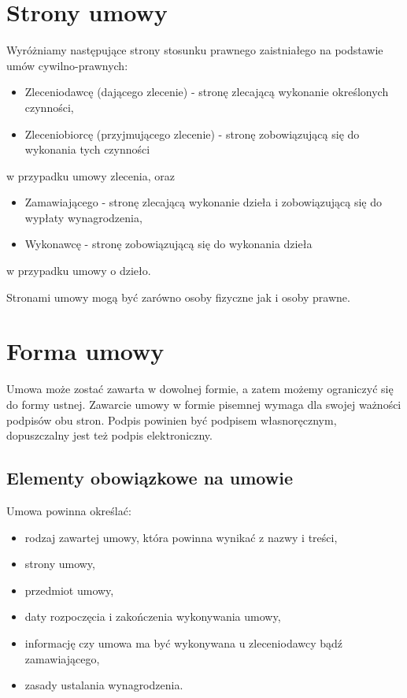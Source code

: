\section[Strony umowy][Strony umowy]{Strony umowy}
Wyróżniamy następujące strony stosunku prawnego zaistniałego na podstawie umów cywilno-prawnych:
\begin{itemize}
	\item Zleceniodawcę (dającego zlecenie) - stronę zlecającą wykonanie określonych czynności,
	\item Zleceniobiorcę (przyjmującego zlecenie) - stronę zobowiązującą się do wykonania tych czynności
\end{itemize}
w przypadku umowy zlecenia, oraz
\begin{itemize}
	\item Zamawiającego - stronę zlecającą wykonanie dzieła i zobowiązującą się do wypłaty wynagrodzenia,
	\item Wykonawcę - stronę zobowiązującą się do wykonania dzieła
\end{itemize}
w przypadku umowy o dzieło.

Stronami umowy mogą być zarówno osoby fizyczne jak i osoby prawne.

\section[Forma umowy][Forma umowy]{Forma umowy}
Umowa może zostać zawarta w dowolnej formie, a zatem możemy ograniczyć się do formy ustnej. Zawarcie umowy w formie pisemnej wymaga dla swojej ważności podpisów obu stron. Podpis powinien być podpisem własnoręcznym, dopuszczalny jest też podpis elektroniczny.

\subsection[Elementy obowiązkowe na umowie][Elementy obowiązkowe na umowie]{Elementy obowiązkowe na umowie}
Umowa powinna określać:
\begin{itemize}
\item rodzaj zawartej umowy, która powinna wynikać z nazwy i treści,
\item strony umowy,
\item przedmiot umowy,
\item daty rozpoczęcia i zakończenia wykonywania umowy,
\item informację czy umowa ma być wykonywana u zleceniodawcy bądź zamawiającego,
\item zasady ustalania wynagrodzenia.
\end{itemize}

